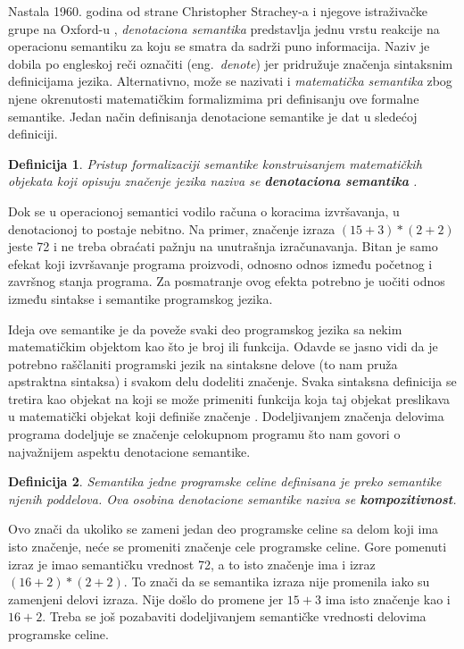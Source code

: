 \documentclass[a4paper]{article}
\newtheorem{definicija}{Definicija}[section]
\begin{document}
{\qquad Nastala 1960. godina od strane Christopher Strachey-a i njegove istraživačke grupe na Oxford-u \cite{slonneger1995book}, \textit{denotaciona semantika} predstavlja jednu vrstu reakcije na operacionu semantiku za koju se smatra da sadrži puno informacija. Naziv je dobila po engleskoj reči označiti (eng.~{\em denote}) jer pridružuje značenja sintaksnim definicijama jezika. Alternativno, može se nazivati i \textit{matematička semantika} zbog njene okrenutosti matematičkim formalizmima pri definisanju ove formalne semantike. Jedan način definisanja denotacione semantike je dat u sledećoj definiciji.
\begin{definicija}
Pristup formalizaciji semantike konstruisanjem matematičkih objekata koji
opisuju značenje jezika naziva se \textbf{denotaciona semantika} \cite{milena}.
\end{definicija}

Dok se u operacionoj semantici vodilo računa o koracima izvršavanja, u denotacionoj to postaje nebitno. Na primer, značenje izraza $ (15+3)*(2+2) $ jeste 72 i ne treba obraćati pažnju na unutrašnja izračunavanja. Bitan je samo efekat koji izvršavanje programa proizvodi, odnosno odnos između početnog i završnog stanja programa. Za posmatranje ovog efekta potrebno je uočiti odnos između sintakse i semantike programskog jezika.

Ideja ove semantike je da poveže svaki deo programskog jezika sa nekim matematičkim objektom kao što je broj ili funkcija. Odavde se jasno vidi da je potrebno raščlaniti programski jezik na sintaksne delove (to nam pruža apstraktna sintaksa) i svakom delu dodeliti značenje. Svaka sintaksna definicija se tretira kao objekat na koji se može primeniti funkcija koja taj objekat preslikava u matematički objekat koji definiše značenje \cite{parezanovic}. Dodeljivanjem značenja delovima programa dodeljuje se značenje celokupnom programu što nam govori o najvažnijem aspektu denotacione semantike.
\begin{definicija}
Semantika jedne programske celine definisana je preko semantike njenih poddelova. Ova osobina denotacione semantike naziva se \textbf{kompozitivnost}.
\end{definicija}

Ovo znači da ukoliko se zameni jedan deo programske celine sa delom koji ima isto značenje, neće se promeniti značenje cele programske celine. Gore pomenuti izraz je imao semantičku vrednost 72, a to isto značenje ima i izraz $ (16+2)*(2+2) $. To znači da se semantika izraza nije promenila iako su zamenjeni delovi izraza. Nije došlo do promene jer $ 15+3 $ ima isto značenje kao i $ 16+2 $. Treba se još pozabaviti dodeljivanjem semantičke vrednosti delovima programske celine.

}
\end{document}
